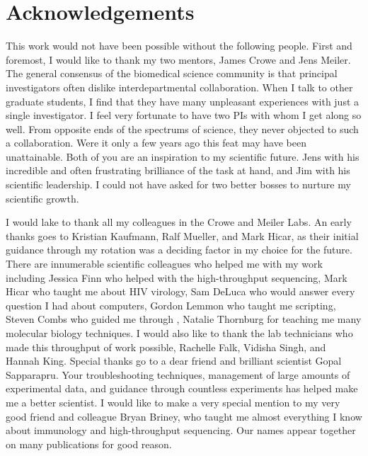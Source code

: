 \chapter*{Acknowledgements}
\vspace{7mm}
This work would not have been possible without the following people.
First and foremost, I would like to thank my two mentors, James Crowe and Jens Meiler. The general consensus of the biomedical science community is that principal investigators often dislike interdepartmental collaboration. When I talk to other graduate students, I find that they have many unpleasant experiences with just a single investigator. I feel very fortunate to have two PIs with whom I get along so well. From opposite ends of the spectrums of science, they never objected to such a collaboration. Were it only a few years ago this feat may have been unattainable. Both of you are an inspiration to my scientific future. Jens with his incredible and often frustrating brilliance of the task at hand, and Jim with his scientific leadership. I could not have asked for two better bosses to nurture my scientific growth.

I would lake to thank all my colleagues in the Crowe and Meiler Labs. An early thanks goes to Kristian Kaufmann, Ralf Mueller, and Mark Hicar, as their initial guidance through my rotation was a deciding factor in my choice for the future. There are innumerable scientific colleagues who helped me with my work including Jessica Finn who helped with the high-throughput sequencing, Mark Hicar who taught me about HIV virology, Sam DeLuca who would answer every question I had about computers, Gordon Lemmon who taught me scripting, Steven Combs who guided me through \rosetta, Natalie Thornburg for teaching me many molecular biology techniques. I would also like to thank the lab technicians who made this throughput of work possible, Rachelle Falk, Vidisha Singh, and Hannah King. Special thanks go to a dear friend and brilliant scientist Gopal Sapparapru. Your troubleshooting techniques, management of large amounts of experimental data, and guidance through countless experiments has helped make me a better scientist. I would like to make a very special mention to my very good friend and colleague Bryan Briney, who taught me almost everything I know about immunology and high-throughput sequencing. Our names appear together on many publications for good reason.

